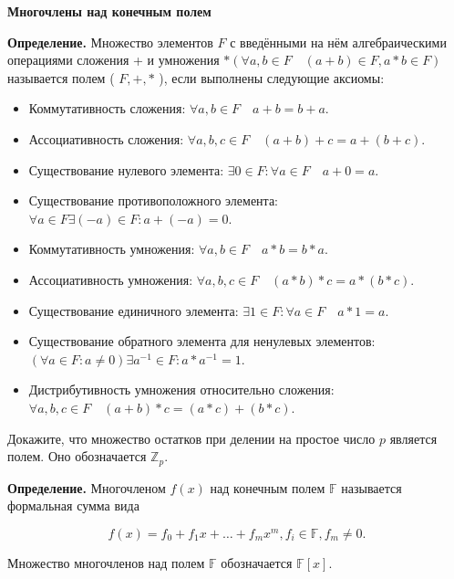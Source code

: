 \centerline{\bf \Huge Многочлены над конечным полем}

\textbf{Определение.} Множество элементов $F$ с введёнными на нём алгебраическими операциями сложения + и умножения $*(\forall a, b \in F \quad(a+b) \in F, a * b \in F)$ называется полем ( $F,+, *$ ), если выполнены следующие аксиомы:

\begin{itemize}
    \item Коммутативность сложения: $\forall a, b \in F \quad a+b=b+a$.
    
    \item Ассоциативность сложения: $\forall a, b, c \in F \quad(a+b)+c=a+(b+c)$.
    
    \item Существование нулевого элемента: $\exists 0 \in F: \forall a \in F \quad a+0=a$.
    
    \item Существование противоположного элемента: $\forall a \in F \exists(-a) \in F: a+(-a)=0$.
    
    \item Коммутативность умножения: $\forall a, b \in F \quad a * b=b * a$.
    
    \item Ассоциативность умножения: $\forall a, b, c \in F \quad(a * b) * c=a *(b * c)$.
    
    \item Существование единичного элемента: $\exists 1 \in F: \forall a \in F \quad a * 1=a$.
    
    \item Существование обратного элемента для ненулевых элементов: $(\forall a \in F: a \neq 0) \exists a^{-1} \in F: a * a^{-1}=1$.
    
    \item Дистрибутивность умножения относительно сложения: $\forall a, b, c \in F \quad(a+b) * c=(a * c)+(b * c)$.
\end{itemize}


Докажите, что множество остатков при делении на простое число $p$ является полем. Оно обозначается $\mathbb{Z}_p$.

\textbf{Определение.} Многочленом $f(x)$ над конечным полем $\mathbb{F}$ называется формальная сумма вида

$$
f(x)=f_0+f_1 x+\ldots+f_m x^m, f_i \in \mathbb{F}, f_m \neq 0 .
$$


Множество многочленов над полем $\mathbb{F}$ обозначается $\mathbb{F}[x]$.

